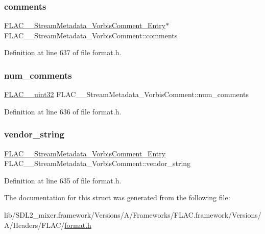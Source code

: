 \subsubsection{\texorpdfstring{comments}{comments}}
{\footnotesize\ttfamily \mbox{\hyperlink{struct_f_l_a_c_____stream_metadata___vorbis_comment___entry}{F\+L\+A\+C\+\_\+\+\_\+\+Stream\+Metadata\+\_\+\+Vorbis\+Comment\+\_\+\+Entry}}$\ast$ F\+L\+A\+C\+\_\+\+\_\+\+Stream\+Metadata\+\_\+\+Vorbis\+Comment\+::comments}



Definition at line 637 of file format.\+h.

\mbox{\label{struct_f_l_a_c_____stream_metadata___vorbis_comment_a6b5a521443691bc3f195c97b60203a3e}} 
\subsubsection{\texorpdfstring{num\_comments}{num\_comments}}
{\footnotesize\ttfamily \mbox{\hyperlink{ordinals_8h_a9c4005ea7ef8d564b0cc993cdd0e4e5e}{F\+L\+A\+C\+\_\+\+\_\+uint32}} F\+L\+A\+C\+\_\+\+\_\+\+Stream\+Metadata\+\_\+\+Vorbis\+Comment\+::num\+\_\+comments}



Definition at line 636 of file format.\+h.

\mbox{\label{struct_f_l_a_c_____stream_metadata___vorbis_comment_a7a6dd7bacee57f0a59ac2d843cb79f98}} 
\subsubsection{\texorpdfstring{vendor\_string}{vendor\_string}}
{\footnotesize\ttfamily \mbox{\hyperlink{struct_f_l_a_c_____stream_metadata___vorbis_comment___entry}{F\+L\+A\+C\+\_\+\+\_\+\+Stream\+Metadata\+\_\+\+Vorbis\+Comment\+\_\+\+Entry}} F\+L\+A\+C\+\_\+\+\_\+\+Stream\+Metadata\+\_\+\+Vorbis\+Comment\+::vendor\+\_\+string}



Definition at line 635 of file format.\+h.



The documentation for this struct was generated from the following file\+:\begin{DoxyCompactItemize}
\item 
lib/\+S\+D\+L2\+\_\+mixer.\+framework/\+Versions/\+A/\+Frameworks/\+F\+L\+A\+C.\+framework/\+Versions/\+A/\+Headers/\+F\+L\+A\+C/\mbox{\hyperlink{format_8h}{format.\+h}}\end{DoxyCompactItemize}
